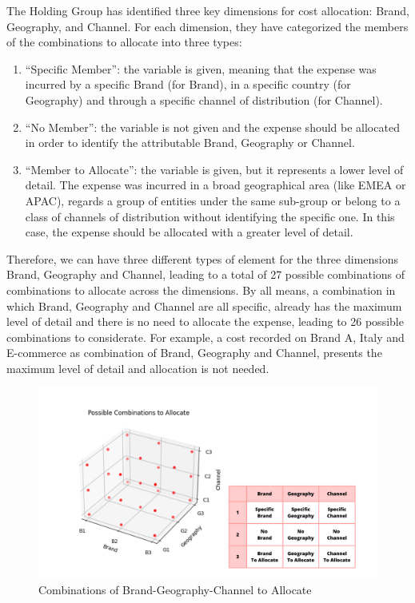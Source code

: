 \documentclass[12pt,a4paper,openright,twoside]{book}
\begin{document}
The Holding Group has identified three key dimensions for cost allocation: Brand, Geography, and Channel. 
%
For each dimension, they have categorized the members of the combinations to allocate into three types: 

\begin{enumerate}
    \item ``Specific Member'': the variable is given, meaning that the expense was incurred by a specific Brand (for Brand), in a specific country (for Geography) and through a specific channel of distribution (for Channel).
    \item ``No Member'': the variable is not given and the expense should be allocated in order to identify the attributable Brand, Geography or Channel.
    \item ``Member to Allocate'': the variable is given, but it represents a lower level of detail. The expense was incurred in a broad geographical area (like EMEA or APAC), regards a group of entities under the same sub-group or belong to a class of channels of distribution without identifying the specific one. In this case, the expense should be allocated with a greater level of detail.
\end{enumerate}

Therefore, we can have three different types of element for the three dimensions Brand, Geography and Channel, leading to a total of 27 possible combinations of combinations to allocate across the dimensions.
%
By all means, a combination in which Brand, Geography and Channel are all specific, already has the maximum level of detail and there is no need to allocate the expense, leading to 26 possible combinations to considerate.
%
For example, a cost recorded on Brand A, Italy and E-commerce as combination of Brand, Geography and Channel, presents the maximum level of detail and allocation is not needed.

\begin{figure}[htbp]
	\centering
	\includegraphics[width=\linewidth]{figures/combinations.pdf}
	\caption{Combinations of Brand-Geography-Channel to Allocate}
	\label{fig:combos}
\end{figure}
\end{document}
